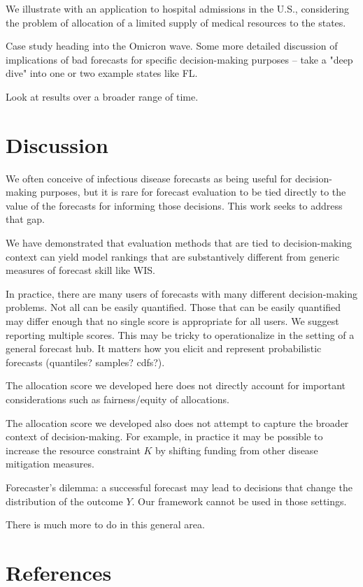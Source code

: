 \documentclass{article}
\begin{document}
We illustrate with an application to hospital admissions in the U.S., considering the problem of allocation of a limited supply of medical resources to the states.

Case study heading into the Omicron wave. Some more detailed discussion of implications of bad forecasts for specific decision-making purposes -- take a "deep dive" into one or two example states like FL.

Look at results over a broader range of time.

\section{Discussion}
\label{sec:discussion}

We often conceive of infectious disease forecasts as being useful for decision-making purposes, but it is rare for forecast evaluation to be tied directly to the value of the forecasts for informing those decisions. This work seeks to address that gap.

We have demonstrated that evaluation methods that are tied to decision-making context can yield model rankings that are substantively different from generic measures of forecast skill like WIS.

In practice, there are many users of forecasts with many different decision-making problems. Not all can be easily quantified. Those that can be easily quantified may differ enough that no single score is appropriate for all users. We suggest reporting multiple scores. This may be tricky to operationalize in the setting of a general forecast hub. It matters how you elicit and represent probabilistic forecasts (quantiles? samples? cdfs?).

The allocation score we developed here does not directly account for important considerations such as fairness/equity of allocations.

The allocation score we developed also does not attempt to capture the broader context of decision-making. For example, in practice it may be possible to increase the resource constraint $K$ by shifting funding from other disease mitigation measures.

Forecaster's dilemma: a successful forecast may lead to decisions that change the distribution of the outcome $Y$. Our framework cannot be used in those settings.

There is much more to do in this general area.

\section{References}

\printbibliography
\end{document}
